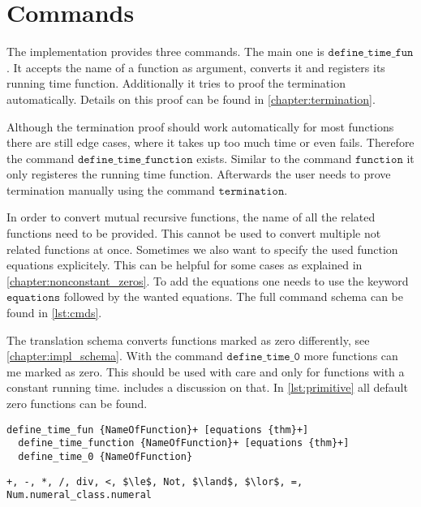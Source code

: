 

\section{Commands}\label{chapter:commands}

The implementation provides three commands.
The main one is $\texttt{define\_time\_fun}$.
It accepts the name of a function as argument, converts it and registers its running time function.
Additionally it tries to proof the termination automatically.
Details on this proof can be found in \autoref{chapter:termination}.

Although the termination proof should work automatically for most functions there are still edge cases, where it takes up too much time or even fails.
Therefore the command $\texttt{define\_time\_function}$ exists.
Similar to the command $\texttt{function}$ it only registeres the running time function.
Afterwards the user needs to prove termination manually using the command $\texttt{termination}$.

In order to convert mutual recursive functions, the name of all the related functions need to be provided.
This cannot be used to convert multiple not related functions at once.
Sometimes we also want to specify the used function equations explicitely.
This can be helpful for some cases as explained in \autoref{chapter:nonconstant_zeros}.
To add the equations one needs to use the keyword $\texttt{equations}$ followed by the wanted equations.
The full command schema can be found in \autoref{lst:cmds}.

The translation schema converts functions marked as zero differently, see \autoref{chapter:impl_schema}.
With the command $\texttt{define\_time\_0}$ more functions can me marked as zero.
This should be used with care and only for functions with a constant running time.
 includes a discussion on that.
In \autoref{lst:primitive} all default zero functions can be found.

\begin{lstlisting}[float,label=lst:cmds,caption=Schema of implemented command]
  define_time_fun {NameOfFunction}+ [equations {thm}+]
  define_time_function {NameOfFunction}+ [equations {thm}+]
  define_time_0 {NameOfFunction}
\end{lstlisting}

\begin{lstlisting}[float,label=lst:primitive,caption=Zero functions by default,mathescape=true]
  +, -, *, /, div, <, $\le$, Not, $\land$, $\lor$, =, Num.numeral_class.numeral
\end{lstlisting}

